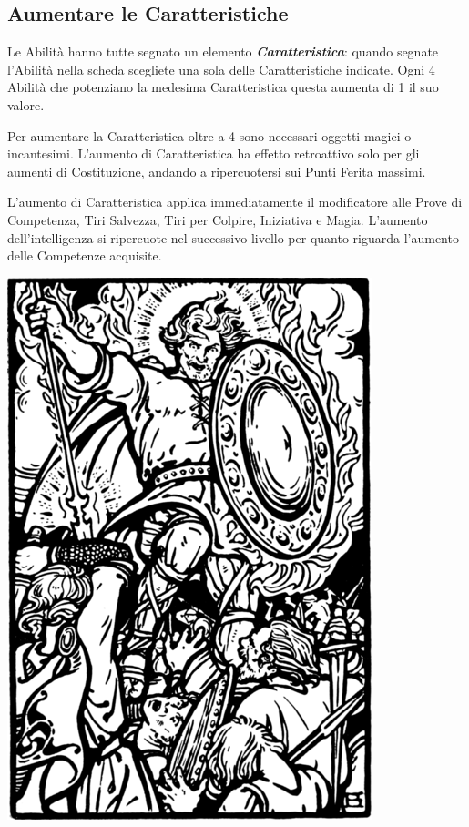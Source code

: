 \begin{multicols}{2}
\subsection{Aumentare le Caratteristiche}\label{aumentarelecaratteristiche}\hypertarget{aumentarelecaratteristiche}{}

Le Abilità hanno tutte segnato un elemento \emph{\textbf{Caratteristica}}: quando segnate l'Abilità nella scheda scegliete una sola delle Caratteristiche indicate. Ogni 4 Abilità che potenziano la medesima Caratteristica questa aumenta di 1 il suo valore.

Per aumentare la Caratteristica oltre a 4 sono necessari oggetti magici o incantesimi. L'aumento di Caratteristica ha effetto retroattivo solo per gli aumenti di Costituzione, andando a ripercuotersi sui Punti Ferita massimi.

L'aumento di Caratteristica applica immediatamente il modificatore alle Prove di Competenza, Tiri Salvezza, Tiri per Colpire, Iniziativa e Magia. L'aumento dell'intelligenza si ripercuote nel successivo livello per quanto riguarda l'aumento delle Competenze acquisite.

\medskip

\begin{center}
	\includegraphics[width=0.9\linewidth]{immagini/guerrieroispirato.png}


\end{center}
\end{multicols}
